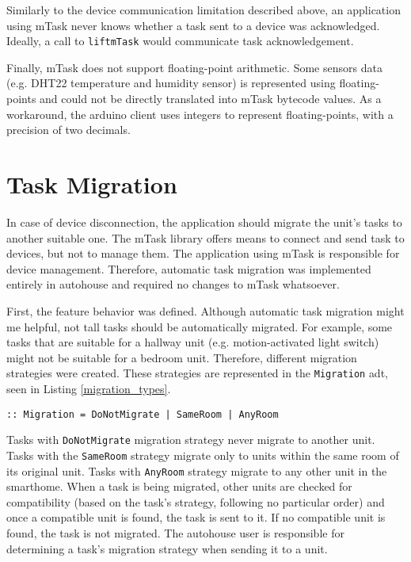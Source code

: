 Similarly to the device communication limitation described above, an application using \gls{mTask} never knows whether a task sent to a device was acknowledged. Ideally, a call to \texttt{liftmTask} would communicate task acknowledgement. 

Finally, \gls{mTask} does not support floating-point arithmetic. Some sensors data (e.g. DHT22 temperature and humidity sensor) is represented using floating-points and could not be directly translated into \gls{mTask} bytecode values. As a workaround, the \gls{arduino} client uses integers to represent floating-points, with a precision of two decimals. 

\section{Task Migration}\label{sec:task_migration}

In case of device disconnection, the application should migrate the unit's tasks to another suitable one. The \gls{mTask} library offers means to connect and send task to devices, but not to manage them. The application using \gls{mTask} is responsible for device management. Therefore, automatic task migration was implemented entirely in \gls{autohouse} and required no changes to \gls{mTask} whatsoever.

First, the feature behavior was defined. Although automatic task migration might me helpful, not tall tasks should be automatically migrated. For example, some tasks that are suitable for a hallway unit (e.g. motion-activated light switch) might not be suitable for a bedroom unit. Therefore, different migration strategies were created. These strategies are represented in the \texttt{Migration} \acs{adt}, seen in Listing \ref{migration_types}. 

\begin{lstlisting}[caption=Task migration strategies of \gls{autohouse},captionpos=b,label=migration_types]
:: Migration = DoNotMigrate | SameRoom | AnyRoom
\end{lstlisting}

Tasks with \texttt{DoNotMigrate} migration strategy never migrate to another unit. Tasks with the \texttt{SameRoom} strategy migrate only to units within the same room of its original unit. Tasks with \texttt{AnyRoom} strategy migrate to any other unit in the smarthome. When a task is being migrated, other units are checked for compatibility (based on the task's strategy, following no particular order) and once a compatible unit is found, the task is sent to it. If no compatible unit is found, the task is not migrated. The \gls{autohouse} user is responsible for determining a task's migration strategy when sending it to a unit.

